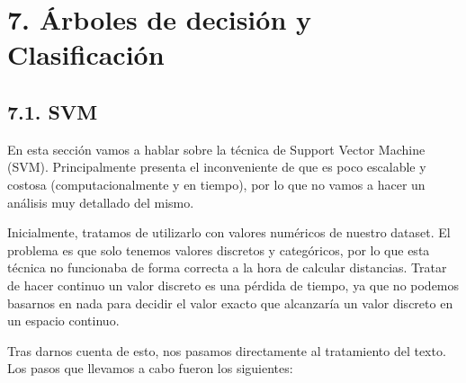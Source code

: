 \documentclass[spanish,]{article}
\begin{document}
\newpage

\section{7. Árboles de decisión y
Clasificación}\label{arboles-de-decision-y-clasificacion}

\subsection{7.1. SVM}\label{svm}

En esta sección vamos a hablar sobre la técnica de Support Vector
Machine (SVM). Principalmente presenta el inconveniente de que es poco
escalable y costosa (computacionalmente y en tiempo), por lo que no
vamos a hacer un análisis muy detallado del mismo.

Inicialmente, tratamos de utilizarlo con valores numéricos de nuestro
dataset. El problema es que solo tenemos valores discretos y
categóricos, por lo que esta técnica no funcionaba de forma correcta a
la hora de calcular distancias. Tratar de hacer continuo un valor
discreto es una pérdida de tiempo, ya que no podemos basarnos en nada
para decidir el valor exacto que alcanzaría un valor discreto en un
espacio continuo.

Tras darnos cuenta de esto, nos pasamos directamente al tratamiento del
texto. Los pasos que llevamos a cabo fueron los siguientes:
\end{document}
